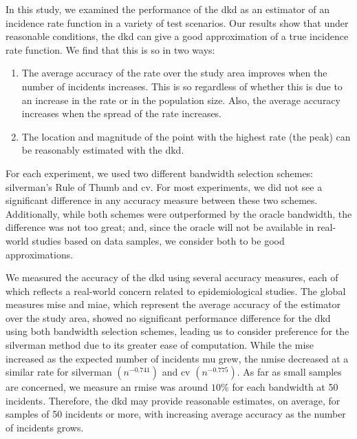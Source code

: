 


In this study,
we examined the performance of the \acrfull{dkd} as an estimator of an incidence rate function in a variety of test scenarios.
Our results show that under reasonable conditions,
the \gls{dkd} can give a good approximation of a true \gls{incidence rate} function.
We find that this is so in two ways:
\begin{enumerate}
    \item The average accuracy of the rate over the study area improves when the number of incidents increases.
    This is so regardless of whether this is due to an increase in the rate or in the population size.
    Also, the average accuracy increases when the spread of the rate increases.
    \item The location and magnitude of the point with the highest rate (the peak) can be reasonably estimated with the \gls{dkd}.
\end{enumerate}

For each experiment,
we used two different bandwidth selection schemes:
\gls{silverman}'s Rule of Thumb and \acrfull{cv}.
For most experiments,
we did not see a significant difference in any accuracy measure between these two schemes.
Additionally,
while both schemes were outperformed by the \gls{oracle bandwidth},
the difference was not too great;
and, since the \gls{oracle} will not be available in real-world studies based on data samples,
we consider both to be good approximations.

We measured the accuracy of the \gls{dkd} using several accuracy measures,
each of which reflects a real-world concern related to epidemiological studies.
The global measures \gls{mise} and \gls{miae},
which represent the average accuracy of the estimator over the study area,
showed no significant performance difference
for the \gls{dkd} using both bandwidth selection schemes,
leading us to consider preference for the \gls{silverman} method due to its greater ease of computation.
While the \gls{mise} increased as the expected number of incidents \gls{mu} grew,
the \acrfull{nmise} decreased at a similar rate for \gls{silverman} $(n^{-0.741})$ and \gls{cv} $(n^{-0.775})$.
As far as small samples are concerned,
we measure an \acrlong{rmise} was around $10\%$ for each bandwidth at 50 incidents.
Therefore,
the \gls{dkd} may provide reasonable estimates,
on average,
for samples of 50 incidents or more,
with increasing average accuracy as the number of incidents grows.

